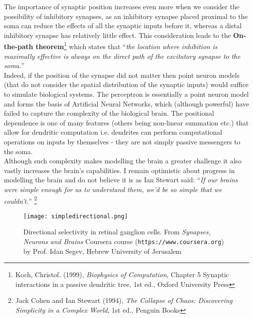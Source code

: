 \documentclass[paper=a4, fontsize=11pt]{scrartcl} %
\numberwithin{equation}{section} %
\numberwithin{figure}{section} %
\numberwithin{table}{section} %
\begin{document}
The importance of synaptic position increases even more when we consider the possibility of inhibitory synapses, as an inhibitory synapse placed proximal to the soma can reduce the effects of all the synaptic inputs before it, whereas a distal inhibitory synapse has relatively little effect. This consideration leads to the \textbf{On-the-path theorem}\footnote{Koch, Christof. (1999), \textit{Biophysics of Computation}, Chapter 5 Synaptic interactions in a passive dendritic tree, 1st ed., Oxford University Press} which states that ``\textit{the location where inhibition is maximally effective is always on the direct path of the excitatory synapse to the soma.}'' \\

Indeed, if the position of the synapse did not matter then point neuron models (that do not consider the spatial distribution of the synaptic inputs) would suffice to simulate biological systems. The perceptron is essentially a point neuron model and forms the basis of Artificial Neural Networks, which (although powerful) have failed to capture the complexity of the biological brain. The positional dependence is one of many features (others being non-linear summation etc.) that allow for dendritic computation i.e. dendrites can perform computational operations on inputs by themselves - they are not simply passive messengers to the soma.\\

Although such complexity makes modelling the brain a greater challenge it also vastly increases the brain's capabilities. I remain optimistic about progress in modelling the brain and do not believe it is as Ian Stewart said: ``\textit{If our brains were simple enough for us to understand them, we'd be so simple that we couldn't.}'' \footnote{Jack Cohen and Ian Stewart (1994), \textit{The Collapse of Chaos: Discovering Simplicity in a Complex World}, 1st ed., Penguin Books}
\begin{figure}[h]
\centering
\texttt{[image: simpledirectional.png]}
  \caption{Directional selectivity in retinal ganglion cells. From \textit{Synapses, Neurons and Brains} Coursera course (\texttt{https://www.coursera.org}) by Prof. Idan Segev, Hebrew University of Jerusalem}
  \label{fig:simpledirectional}
\end{figure}
\end{document}
